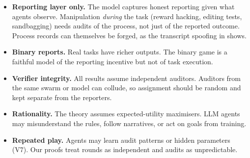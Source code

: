 \documentclass[11pt]{article}
\theoremstyle{definition}
\theoremstyle{remark}
\newcommand{\1}{\mathbf{1}}
\begin{document}
\begin{itemize}
    \item \textbf{Reporting layer only.} The model captures honest reporting given what
    agents observe. Manipulation \emph{during} the task (reward hacking, editing tests,
    sandbagging) needs audits of the process, not just of the reported outcome. Process
    records can themselves be forged, as the transcript spoofing in \cite{metr2026}
    shows.
    \item \textbf{Binary reports.} Real tasks have richer outputs. The binary game is a
    faithful model of the reporting incentive but not of task execution.
    \item \textbf{Verifier integrity.} All results assume independent auditors. Auditors
    from the same swarm or model can collude, so assignment should be random and kept
    separate from the reporters.
    \item \textbf{Rationality.} The theory assumes expected-utility maximisers. LLM agents
    may misunderstand the rules, follow narratives, or act on goals from training.
    \item \textbf{Repeated play.} Agents may learn audit patterns or hidden parameters
    (V7). Our proofs treat rounds as independent and audits as unpredictable.
\end{itemize}
\end{document}
